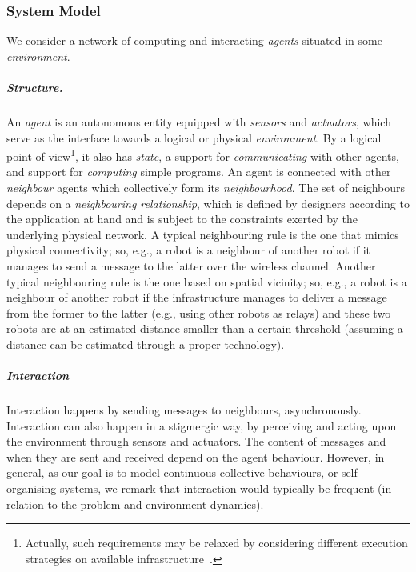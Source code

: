 \subsubsection{System Model}
\label{ssec:background:sysmodel}

We consider a network of computing and interacting \emph{agents} situated in some \emph{environment}.

\subparagraph*{Structure.}
%
An \emph{agent} is an autonomous entity
 equipped with \emph{sensors} and \emph{actuators}, which serve as the interface towards a logical or physical \emph{environment}.
%
By a logical point of view\footnote{Actually, such requirements may be relaxed by considering different execution strategies on available infrastructure~\cite{DBLP:journals/fi/CasadeiPPVW20}.}, it also has \emph{state}, a support for \emph{communicating} with other agents, and support for \emph{computing} simple programs.
%
An agent is connected with other \emph{neighbour} agents which collectively form its \emph{neighbourhood}.
%
The set of neighbours depends on a \emph{neighbouring relationship}, which is defined by designers according to the application at hand
and is subject to the constraints exerted by the underlying physical network.
%
A typical neighbouring rule
 is the one that mimics physical connectivity;
 so, e.g., a robot is a neighbour of another robot if it manages to send a message to the latter over the wireless channel.
%
Another typical neighbouring rule is the one
 based on spatial vicinity;
 so, e.g., a robot is a neighbour of another robot if the infrastructure manages to deliver a message from the former to the latter (e.g., using other robots as relays)
  and these two robots are at an estimated distance smaller than a certain threshold
  (assuming a distance can be estimated through a proper technology).

\subparagraph*{Interaction}
%
Interaction happens by sending messages
 to neighbours, asynchronously.
%
Interaction can also happen in a stigmergic way, by perceiving and acting upon the environment through sensors and actuators.
%
The content of messages and when they are sent and received depend on the agent behaviour.
%
However, in general, as our goal is to model continuous collective behaviours, or self-organising systems,
 we remark that interaction would typically be frequent (in relation to the problem and environment dynamics).

